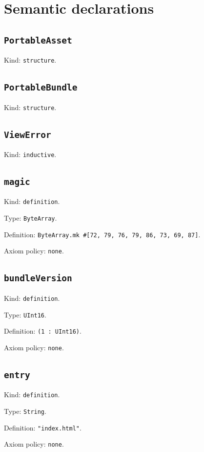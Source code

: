\documentclass[11pt]{article}
\begin{document}
\section*{Semantic declarations}
\subsection*{\texttt{PortableAsset}}
\noindent Kind: \texttt{structure}.\par
\subsection*{\texttt{PortableBundle}}
\noindent Kind: \texttt{structure}.\par
\subsection*{\texttt{ViewError}}
\noindent Kind: \texttt{inductive}.\par
\subsection*{\texttt{magic}}
\noindent Kind: \texttt{definition}.\par
\noindent Type: \texttt{ByteArray}.\par
\noindent Definition: \texttt{ByteArray.mk \#[72, 79, 76, 79, 86, 73, 69, 87]}.\par
\noindent Axiom policy: \texttt{none}.\par
\subsection*{\texttt{bundleVersion}}
\noindent Kind: \texttt{definition}.\par
\noindent Type: \texttt{UInt16}.\par
\noindent Definition: \texttt{(1 : UInt16)}.\par
\noindent Axiom policy: \texttt{none}.\par
\subsection*{\texttt{entry}}
\noindent Kind: \texttt{definition}.\par
\noindent Type: \texttt{String}.\par
\noindent Definition: \texttt{"index.html"}.\par
\noindent Axiom policy: \texttt{none}.\par
\end{document}
